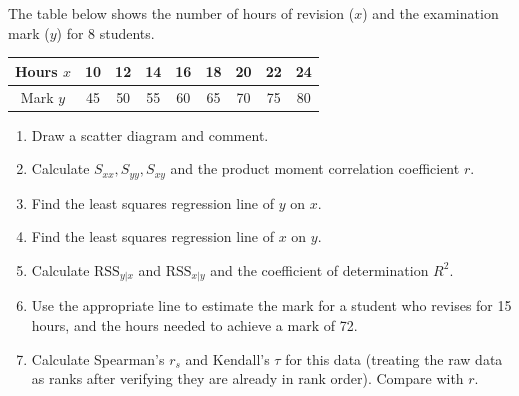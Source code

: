 \documentclass[11pt]{article}
\begin{document}
\begin{exercice}
The table below shows the number of hours of revision ($x$) and the examination mark ($y$) for 8 students.

\begin{center}
\begin{tabular}{|c|c|c|c|c|c|c|c|c|}
\hline
Hours $x$ & 10 & 12 & 14 & 16 & 18 & 20 & 22 & 24 \\
\hline
Mark $y$  & 45 & 50 & 55 & 60 & 65 & 70 & 75 & 80 \\
\hline
\end{tabular}
\end{center}

\begin{enumerate}
\item Draw a scatter diagram and comment.
\item Calculate $S_{xx}, S_{yy}, S_{xy}$ and the product moment correlation coefficient $r$.
\item Find the least squares regression line of $y$ on $x$.
\item Find the least squares regression line of $x$ on $y$.
\item Calculate $\text{RSS}_{y|x}$ and $\text{RSS}_{x|y}$ and the coefficient of determination $R^2$.
\item Use the appropriate line to estimate the mark for a student who revises for 15 hours, and the hours needed to achieve a mark of 72.
\item Calculate Spearman's $r_s$ and Kendall's $\tau$ for this data (treating the raw data as ranks after verifying they are already in rank order). Compare with $r$.
\end{enumerate}
\end{exercice}
\end{document}
